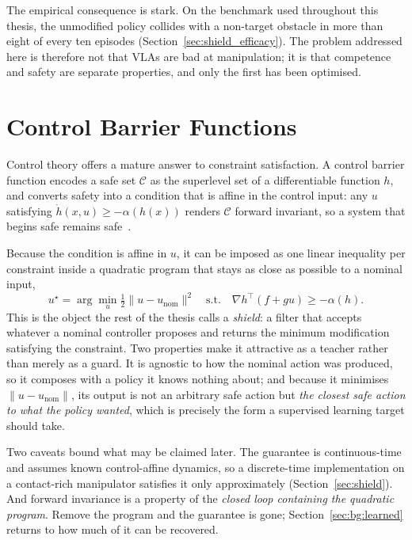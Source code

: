 The empirical consequence is stark. On the benchmark used throughout this thesis, the unmodified
policy collides with a non-target obstacle in more than eight of every ten episodes
(Section~\ref{sec:shield_efficacy}). The problem addressed here is therefore not that VLAs are bad
at manipulation; it is that competence and safety are separate properties, and only the first has
been optimised.

\section{Control Barrier Functions}\label{sec:bg:cbf}

Control theory offers a mature answer to constraint satisfaction. A control barrier function
encodes a safe set $\mathcal{C}$ as the superlevel set of a differentiable function $h$, and
converts safety into a condition that is affine in the control input: any $u$ satisfying
$\dot{h}(x,u) \ge -\alpha(h(x))$ renders $\mathcal{C}$ forward invariant, so a system that begins
safe remains safe~\cite{ames2017cbf}.

Because the condition is affine in $u$, it can be imposed as one linear inequality per constraint
inside a quadratic program that stays as close as possible to a nominal input,
\begin{equation}
  u^{\star} = \arg\min_{u} \tfrac{1}{2}\lVert u - u_{\mathrm{nom}} \rVert^{2}
  \quad \text{s.t.} \quad
  \nabla h^{\top}\!\left(f + gu\right) \ge -\alpha(h).
  \label{eq:cbf_qp}
\end{equation}
This is the object the rest of the thesis calls a \emph{shield}: a filter that accepts whatever a
nominal controller proposes and returns the minimum modification satisfying the constraint. Two
properties make it attractive as a teacher rather than merely as a guard. It is agnostic to how the
nominal action was produced, so it composes with a policy it knows nothing about; and because it
minimises $\lVert u - u_{\mathrm{nom}} \rVert$, its output is not an arbitrary safe action but
\emph{the closest safe action to what the policy wanted}, which is precisely the form a supervised
learning target should take.

Two caveats bound what may be claimed later. The guarantee is continuous-time and assumes known
control-affine dynamics, so a discrete-time implementation on a contact-rich manipulator satisfies
it only approximately (Section~\ref{sec:shield}). And forward invariance is a property of the
\emph{closed loop containing the quadratic program}. Remove the program and the guarantee is gone;
Section~\ref{sec:bg:learned} returns to how much of it can be recovered.

